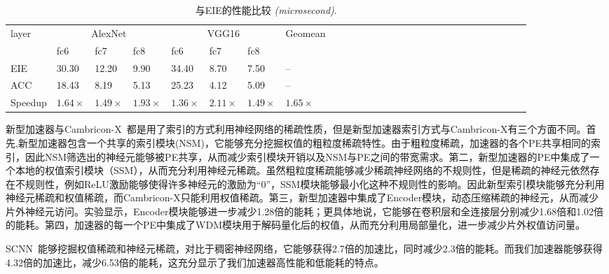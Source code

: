 \begin{table}[h]
\centering
\caption{\footnotesize 与EIE的性能比较 \emph{(microsecond)}.}
\label{tab:EIE}
\begin{tabular}{@{}lll@{~~}lll@{~~}lll@{~~}lll@{~~}lll@{~~}lll@{~~}lll@{~~}lllllll}
\toprule
layer & \multicolumn{3}{c}{AlexNet} & \multicolumn{3}{c}{VGG16} & Geomean\\
& fc6 & fc7 & fc8 & fc6 & fc7 & fc8     \\
\midrule
EIE & 30.30 & 12.20 & 9.90  & 34.40 & 8.70  & 7.50  & --\\
ACC & 18.43 & 8.19  & 5.13  & 25.23 & 4.12  & 5.09  & --\\
Speedup & $1.64\times$ & $1.49\times$ & $1.93\times$ & $1.36\times$ & $2.11\times$ & $1.49\times$ & $1.65\times$ \\
\bottomrule
\end{tabular}
\end{table}

新型加速器与Cambricon-X~\cite{zhang2016cambricon}都是用了索引的方式利用神经网络的稀疏性质，但是新型加速器索引方式与Cambricon-X有三个方面不同。首先,新型加速器包含一个共享的索引模块(NSM)，它能够充分挖掘权值的粗粒度稀疏特性。由于粗粒度稀疏，加速器的各个PE共享相同的索引，因此NSM筛选出的神经元能够被PE共享，从而减少索引模块开销以及NSM与PE之间的带宽需求。第二，新型加速器的PE中集成了一个本地的权值索引模块（SSM），从而充分利用神经元稀疏。虽然粗粒度稀疏能够减少稀疏神经网络的不规则性，但是稀疏的神经元依然存在不规则性，例如ReLU激励能够使得许多神经元的激励为“0”，SSM模块能够最小化这种不规则性的影响。因此新型索引模块能够充分利用神经元稀疏和权值稀疏，而Cambricon-X只能利用权值稀疏。第三，新型加速器中集成了Encoder模块，动态压缩稀疏的神经元，从而减少片外神经元访问。实验显示，Encoder模块能够进一步减少1.28倍的能耗；更具体地说，它能够在卷积层和全连接层分别减少1.68倍和1.02倍的能耗。第四，加速器的每一个PE中集成了WDM模块用于解码量化后的权值，从而充分利用局部量化，进一步减少片外权值访问量。

SCNN~\cite{angshuman2017scnn}能够挖掘权值稀疏和神经元稀疏，对比于稠密神经网络，它能够获得2.7倍的加速比，同时减少2.3倍的能耗。而我们加速器能够获得4.32倍的加速比，减少6.53倍的能耗，这充分显示了我们加速器高性能和低能耗的特点。

